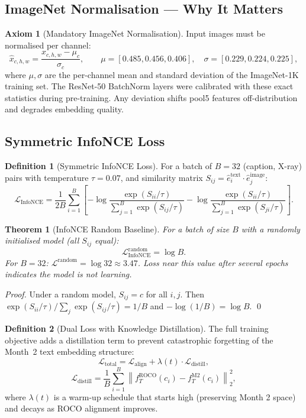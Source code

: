 \documentclass[12pt, a4paper]{article}
\theoremstyle{definition}
\newtheorem{definition}{Definition}[section]
\newtheorem{axiom}{Axiom}[section]
\theoremstyle{plain}
\newtheorem{theorem}{Theorem}[section]
\theoremstyle{remark}
\begin{document}
\subsection{ImageNet Normalisation --- Why It Matters}

\begin{axiom}[Mandatory ImageNet Normalisation]
Input images must be normalised per channel:
\[
\hat{x}_{c,h,w} = \frac{x_{c,h,w} - \mu_c}{\sigma_c}, \qquad
\mu = [0.485, 0.456, 0.406],\quad
\sigma = [0.229, 0.224, 0.225],
\]
where $\mu, \sigma$ are the per-channel mean and standard deviation of the ImageNet-1K training set. The ResNet-50 BatchNorm layers were calibrated with these exact statistics during pre-training. Any deviation shifts pool5 features off-distribution and degrades embedding quality.
\end{axiom}

\subsection{Symmetric InfoNCE Loss}

\begin{definition}[Symmetric InfoNCE Loss]
For a batch of $B = 32$ (caption, X-ray) pairs with temperature $\tau = 0.07$, and similarity matrix $S_{ij} = \hat{e}^{\text{text}}_i \cdot \hat{e}^{\text{image}}_j$:
\[
\mathcal{L}_{\text{InfoNCE}} = \frac{1}{2B}\sum_{i=1}^{B}\left[
  -\log\frac{\exp(S_{ii}/\tau)}{\sum_{j=1}^{B}\exp(S_{ij}/\tau)}
  -\log\frac{\exp(S_{ii}/\tau)}{\sum_{j=1}^{B}\exp(S_{ji}/\tau)}
\right].
\]
\end{definition}

\begin{theorem}[InfoNCE Random Baseline]
For a batch of size $B$ with a randomly initialised model (all $S_{ij}$ equal):
\[
\mathcal{L}_{\text{InfoNCE}}^{\text{random}} = \log B.
\]
For $B = 32$: $\mathcal{L}^{\text{random}} = \log 32 \approx 3.47$. Loss near this value after several epochs indicates the model is not learning.
\end{theorem}

\begin{proof}
Under a random model, $S_{ij} = c$ for all $i,j$. Then $\exp(S_{ii}/\tau) / \sum_j \exp(S_{ij}/\tau) = 1/B$ and $-\log(1/B) = \log B$. \qed
\end{proof}

\begin{definition}[Dual Loss with Knowledge Distillation]
The full training objective adds a distillation term to prevent catastrophic forgetting of the Month~2 text embedding structure:
\[
\mathcal{L}_{\text{total}} = \mathcal{L}_{\text{align}} + \lambda(t) \cdot \mathcal{L}_{\text{distill}},
\]
\[
\mathcal{L}_{\text{distill}} = \frac{1}{B}\sum_{i=1}^{B}\!\left\|
  f_T^{\text{ROCO}}(c_i) - f_T^{\text{M2}}(c_i)
\right\|_2^2,
\]
where $\lambda(t)$ is a warm-up schedule that starts high (preserving Month 2 space) and decays as ROCO alignment improves.
\end{definition}
\end{document}
